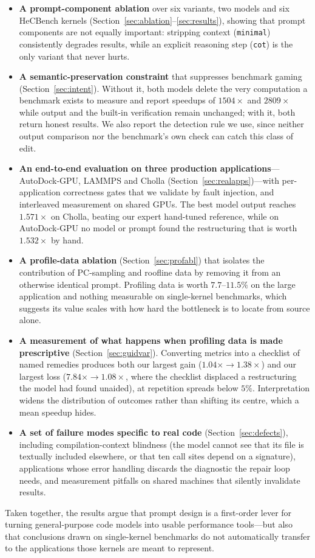 \begin{itemize}\itemsep2pt
\item \textbf{A prompt-component ablation} over six variants, two models and six HeCBench kernels
  (Section~\ref{sec:ablation}--\ref{sec:results}), showing that prompt components are not equally
  important: stripping context (\texttt{minimal}) consistently degrades results, while an explicit
  reasoning step (\texttt{cot}) is the only variant that never hurts.
\item \textbf{A semantic-preservation constraint} that suppresses benchmark gaming
  (Section~\ref{sec:intent}). Without it, both models delete the very computation a benchmark exists to
  measure and report speedups of $1504\times$ and $2809\times$ while output and the built-in
  verification remain unchanged; with it, both return honest results. We also report the detection rule
  we use, since neither output comparison nor the benchmark's own check can catch this class of edit.
\item \textbf{An end-to-end evaluation on three production applications}---AutoDock-GPU, LAMMPS and
  Cholla (Section~\ref{sec:realapps})---with per-application correctness gates that we validate by
  fault injection, and interleaved measurement on shared GPUs. The best model output reaches
  $1.571\times$ on Cholla, beating our expert hand-tuned reference, while on AutoDock-GPU no model or
  prompt found the restructuring that is worth $1.532\times$ by hand.
\item \textbf{A profile-data ablation} (Section~\ref{sec:profabl}) that isolates the contribution of
  PC-sampling and roofline data by removing it from an otherwise identical prompt. Profiling data is
  worth $7.7$--$11.5\%$ on the large application and nothing measurable on single-kernel benchmarks,
  which suggests its value scales with how hard the bottleneck is to locate from source alone.
\item \textbf{A measurement of what happens when profiling data is made prescriptive}
  (Section~\ref{sec:guidvar}). Converting metrics into a checklist of named remedies produces both our
  largest gain ($1.04\times \to 1.38\times$) and our largest loss ($7.84\times \to 1.08\times$, where the
  checklist displaced a restructuring the model had found unaided), at repetition spreads below $5\%$.
  Interpretation widens the distribution of outcomes rather than shifting its centre, which a mean
  speedup hides.
\item \textbf{A set of failure modes specific to real code} (Section~\ref{sec:defects}), including compilation-context blindness
  (the model cannot see that its file is textually included elsewhere, or that ten call sites depend on
  a signature), applications whose error handling discards the diagnostic the repair loop needs, and
  measurement pitfalls on shared machines that silently invalidate results.
\end{itemize}

Taken together, the results argue that prompt design is a first-order lever for turning general-purpose
code models into usable performance tools---but also that conclusions drawn on single-kernel benchmarks
do not automatically transfer to the applications those kernels are meant to represent.
